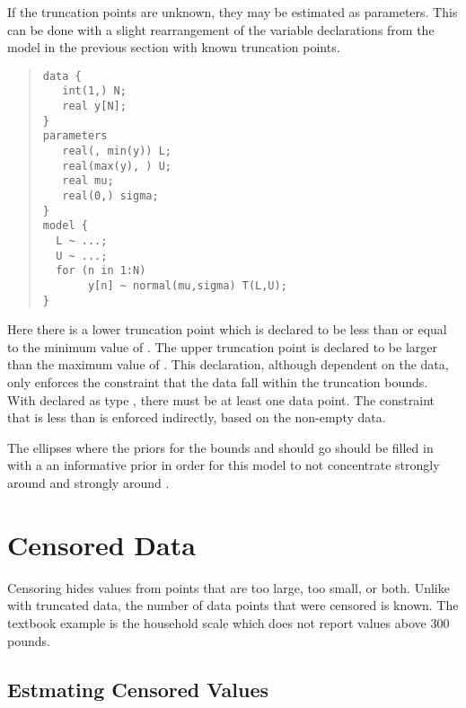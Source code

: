 If the truncation points are unknown, they may be estimated as
parameters.  This can be done with a slight rearrangement of the
variable declarations from the model in the previous section with
known truncation points.
%
\begin{quote}
\begin{Verbatim}
data {
   int(1,) N;
   real y[N];
}
parameters
   real(, min(y)) L; 
   real(max(y), ) U;
   real mu;
   real(0,) sigma;
}
model {
  L ~ ...;  
  U ~ ...;
  for (n in 1:N)
       y[n] ~ normal(mu,sigma) T(L,U);
}
\end{Verbatim}
\end{quote}
%
Here there is a lower truncation point  which is declared to
be less than or equal to the minimum value of .  The upper
truncation point  is declared to be larger than the maximum
value of .  This declaration, although dependent on the data,
only enforces the constraint that the data fall within the truncation
bounds.  With  declared as type , there must be
at least one data point.  The constraint that  is less than
 is enforced indirectly, based on the non-empty data.

The ellipses where the priors for the bounds  and 
should go should be filled in with a an informative prior in
order for this model to not concentrate  strongly around 
 and  strongly around .


\section{Censored Data}

Censoring hides values from points that are too large, too small, or
both.  Unlike with truncated data, the number of data points that were
censored is known.  The textbook example is the household scale which
does not report values above 300 pounds.  

\subsection{Estmating Censored Values}

